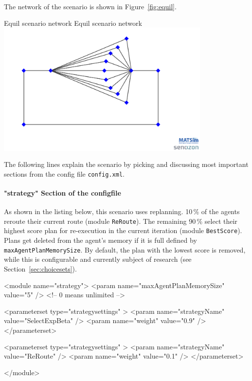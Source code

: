 The network of the scenario is shown in Figure~\ref{fig:equil}.

\createfigure%
{Equil scenario network}%
{Equil scenario network}%
{\label{fig:equil}}%
{\includegraphics[width=0.8\textwidth, angle=0]{using/figures/equil.png}}%
{}

The following lines explain the scenario by picking and discussing most important sections from the config file \lstinline|config.xml|.


\paragraph{"strategy" Section of the \gls{configfile}}

As shown in the listing below, this scenario uses replanning. 10\,\% of the agents reroute their current route (module \lstinline|ReRoute|). The remaining 90\,\% select their highest score plan for re-execution in the current iteration (module \lstinline|BestScore|). Plans get deleted from the agent's memory if it is full defined by \lstinline|maxAgentPlanMemorySize|. By default, the plan with the lowest score is removed, while this is configurable and currently subject of
research (see Section~\ref{sec:choicesets}).
%
\begin{xml}
<module name="strategy">
	<param name="maxAgentPlanMemorySize" value="5" /> <!-- 0 means unlimited -->
	
	<parameterset type="strategysettings" >
		<param name="strategyName" value="SelectExpBeta" />
		<param name="weight" value="0.9" />
	</parameterset>
	
	<parameterset type="strategysettings" >
		<param name="strategyName" value="ReRoute" />
		<param name="weight" value="0.1" />
	</parameterset>
	
</module>
\end{xml}


